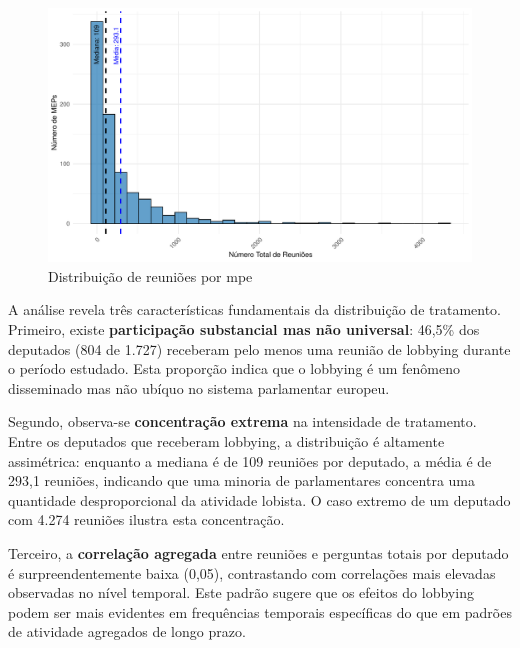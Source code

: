 \begin{figure}[htbp]
    \centering
    \includegraphics[width=\textwidth]{figures/descriptive_plots/fig3.1_meetings_hist.pdf}
    \caption{Distribuição de reuniões por \acrshort{mpe}}
    \label{fig:meetings_hist}
\end{figure}


A análise revela três características fundamentais da distribuição de tratamento. Primeiro, existe \textbf{participação substancial mas não universal}: 46,5\% dos deputados (804 de 1.727) receberam pelo menos uma reunião de lobbying durante o período estudado. Esta proporção indica que o lobbying é um fenômeno disseminado mas não ubíquo no sistema parlamentar europeu.

Segundo, observa-se \textbf{concentração extrema} na intensidade de tratamento. Entre os deputados que receberam lobbying, a distribuição é altamente assimétrica: enquanto a mediana é de 109 reuniões por deputado, a média é de 293,1 reuniões, indicando que uma minoria de parlamentares concentra uma quantidade desproporcional da atividade lobista. O caso extremo de um deputado com 4.274 reuniões ilustra esta concentração.

Terceiro, a \textbf{correlação agregada} entre reuniões e perguntas totais por deputado é surpreendentemente baixa (0,05), contrastando com correlações mais elevadas observadas no nível temporal. Este padrão sugere que os efeitos do lobbying podem ser mais evidentes em frequências temporais específicas do que em padrões de atividade agregados de longo prazo.


